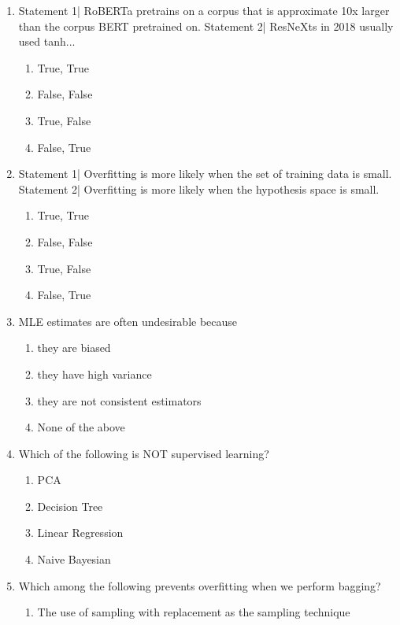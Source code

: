 \documentclass[{\csname fa0013Font0\endcsname\char"0033}{\csname fa0014Font0\endcsname\char"0034}pt]{article}
\begin{document}
\begin{enumerate}[label=\arabic*.]
\begin{enumerate}[label=(\alph*)]
    \item To avoid overfitting the training set
\end{enumerate}
\item Statement 1| RoBERTa pretrains on a corpus that is approximate 10x larger than the corpus BERT pretrained on. Statement 2| ResNeXts in 2018 usually used tanh...
\begin{enumerate}[label=(\alph*)]
    \item True, True
    \item False, False
    \item True, False
    \item False, True
\end{enumerate}
\item Statement 1| Overfitting is more likely when the set of training data is small. Statement 2| Overfitting is more likely when the hypothesis space is small.
\begin{enumerate}[label=(\alph*)]
    \item True, True
    \item False, False
    \item True, False
    \item False, True
\end{enumerate}
\item MLE estimates are often undesirable because
\begin{enumerate}[label=(\alph*)]
    \item they are biased
    \item they have high variance
    \item they are not consistent estimators
    \item None of the above
\end{enumerate}
\item Which of the following is NOT supervised learning?
\begin{enumerate}[label=(\alph*)]
    \item PCA
    \item Decision Tree
    \item Linear Regression
    \item Naive Bayesian
\end{enumerate}
\item Which among the following prevents overfitting when we perform bagging?
\begin{enumerate}[label=(\alph*)]
    \item The use of sampling with replacement as the sampling technique

\end{enumerate}
\end{enumerate}
\end{document}

